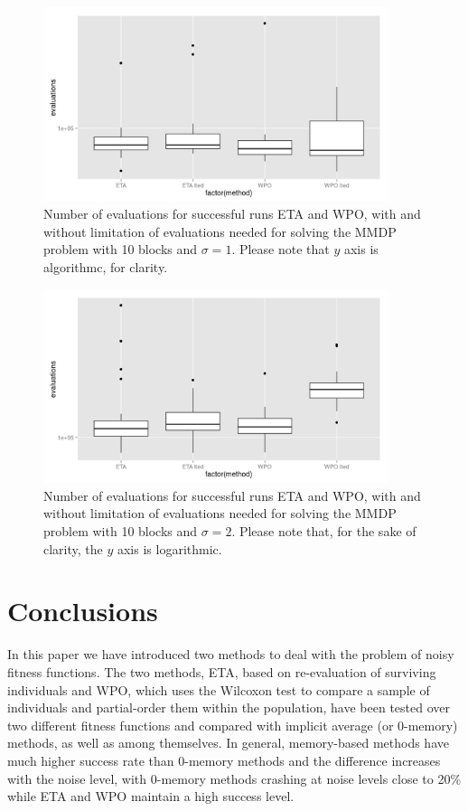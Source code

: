 \documentclass{llncs}
\begin{document}
\begin{figure}[!ht] 
\centering
\includegraphics[width=0.9\textwidth]{../images/ns1-MMDP.png}
\caption{Number of evaluations for successful runs ETA and WPO, with
  and without limitation of evaluations needed for solving the MMDP
  problem with 10 blocks and $\sigma=1$. Please note that $y$ axis is
  algorithmc, for clarity. \label{fig:lted:ns1}}
\end{figure}
%
\begin{figure}[!ht] 
\centering
\includegraphics[width=0.9\textwidth]{../images/ns2-MMDP.png}
\caption{Number of evaluations for successful runs ETA and WPO, with
  and without limitation of evaluations needed for solving the MMDP
  problem with 10 blocks and $\sigma=2$. Please note that, for the
  sake of clarity, the $y$ axis is logarithmic.\label{fig:lted:ns2}}
\end{figure}

\section{Conclusions}

In this paper we have introduced two methods to deal with the problem
of noisy fitness functions. The two methods, {\sf ETA}, based on
re-evaluation of surviving individuals and {\sf WPO}, which uses the
Wilcoxon test to compare a sample of individuals and partial-order
them within the population, 
 have been tested over two
different fitness functions and compared with implicit average (or
0-memory) methods, as well as among themselves. In general,
memory-based methods have much higher success rate than 0-memory
methods and the difference increases with the noise level, with
0-memory methods crashing at noise levels close to 20\% while ETA and
WPO maintain a high success level.
\end{document}

